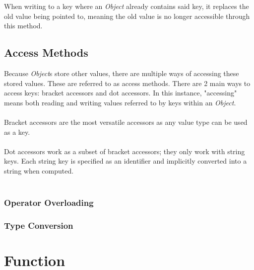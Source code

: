 \documentclass[12pt,letterpaper]{report}
\begin{document}
When writing to a key where an \textit{Object} already contains said key, it replaces the old value being pointed to, meaning the old value 
is no longer accessible through this method.

\subsection{Access Methods}\label{Access Methods}

Because \textit{Object}s store other values, there are multiple ways of accessing these stored values. These are referred to 
as access methods. There are 2 main ways to access keys: bracket accessors and dot accessors.
In this instance, "accessing" means both reading and writing values referred to by keys within an \textit{Object}.
\\\\
Bracket accessors are the most versatile accessors as any value type can be used as a key.
\\\\


Dot accessors work as a subset of bracket accessors; they only work with string keys. 
Each string key is specified as an identifier and implicitly converted into a string when computed.
\\\\






  

\subsubsection{Operator Overloading}\label{Operator Overloading}
\subsubsection{Type Conversion}\label{Type Conversion}



\section{Function}\label{Function}
\end{document}
